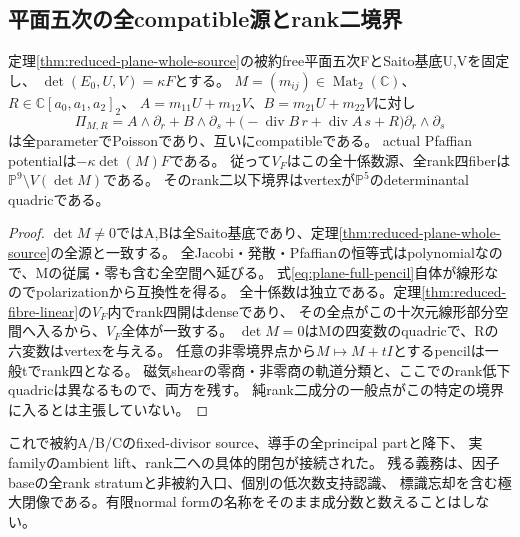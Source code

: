 \subsection{平面五次の全compatible源とrank二境界}
\begin{proposition}[全十係数とdeterminant境界]\label{prop:plane-fixed-divisor-pencil}
定理\ref{thm:reduced-plane-whole-source}の被約free平面五次FとSaito基底U,Vを固定し、
$\det(E_0,U,V)=\kappa F$とする。
$M=(m_{ij})\in\operatorname{Mat}_2(\mathbb C)$、$R\in\mathbb C[a_0,a_1,a_2]_2$、
$A=m_{11}U+m_{12}V$、$B=m_{21}U+m_{22}V$に対し
\begin{equation}
 \Pi_{M,R}=A\wedge\partial_r+B\wedge\partial_s+
 \bigl(-\operatorname{div}B\,r+\operatorname{div}A\,s+R\bigr)
 \partial_r\wedge\partial_s                                 \label{eq:plane-full-pencil}
\end{equation}
は全parameterでPoissonであり、互いにcompatibleである。
actual Pfaffian potentialは$-\kappa\det(M)F$である。
従って$V_F$はこの全十係数源、全rank四fiberは$\mathbb P^9\setminus V(\det M)$である。
そのrank二以下境界はvertexが$\mathbb P^5$のdeterminantal quadricである。
\end{proposition}
\begin{proof}
$\det M\ne0$ではA,Bは全Saito基底であり、定理\ref{thm:reduced-plane-whole-source}の全源と一致する。
全Jacobi・発散・Pfaffianの恒等式はpolynomialなので、Mの従属・零も含む全空間へ延びる。
式\eqref{eq:plane-full-pencil}自体が線形なのでpolarizationから互換性を得る。
全十係数は独立である。定理\ref{thm:reduced-fibre-linear}の$V_F$内でrank四開はdenseであり、
その全点がこの十次元線形部分空間へ入るから、$V_F$全体が一致する。
$\det M=0$はMの四変数のquadricで、Rの六変数はvertexを与える。
任意の非零境界点から$M\mapsto M+tI$とするpencilは一般tでrank四となる。
磁気shearの零商・非零商の軌道分類と、ここでのrank低下quadricは異なるもので、両方を残す。
純rank二成分の一般点がこの特定の境界に入るとは主張していない。
\end{proof}

これで被約A/B/Cのfixed-divisor source、導手の全principal partと降下、
実familyのambient lift、rank二への具体的閉包が接続された。
残る義務は、因子baseの全rank stratumと非被約入口、個別の低次数支持認識、
標識忘却を含む極大閉像である。有限normal formの名称をそのまま成分数と数えることはしない。

